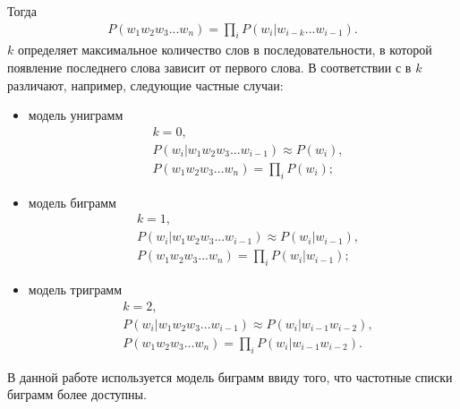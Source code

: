 Тогда
\begin{align}
	P(w_1w_2w_3...w_n) = \prod_{i}P(w_i|w_{i-k}...w_{i-1}).
\end{align}
\(k\) определяет максимальное количество слов в последовательности, в которой появление последнего слова зависит от первого слова. В соответствии с в \(k\) различают, например, следующие частные случаи:
\begin{itemize}
	\item
	модель униграмм
	\begin{align}
		&k = 0, \nonumber \\
		&P(w_i|w_1w_2w_3...w_{i-1}) \approx P(w_i), \\
		&P(w_1w_2w_3...w_n) = \prod_{i}P(w_i); 
	\end{align}
	\item
	модель биграмм
	\begin{align}
		&k = 1, \nonumber \\
		&P(w_i|w_1w_2w_3...w_{i-1}) \approx P(w_i|w_{i-1}), \\
		&P(w_1w_2w_3...w_n) = \prod_{i}P(w_i|w_{i-1});
	\end{align}
	\item
	модель триграмм
	\begin{align}
		&k = 2, \nonumber \\
		&P(w_i|w_1w_2w_3...w_{i-1}) \approx P(w_i|w_{i-1}w_{i-2}), \\
		&P(w_1w_2w_3...w_n) = \prod_{i}P(w_i|w_{i-1}w_{i-2}).
	\end{align}
\end{itemize}
В данной работе используется модель биграмм ввиду того, что частотные списки биграмм более доступны.
